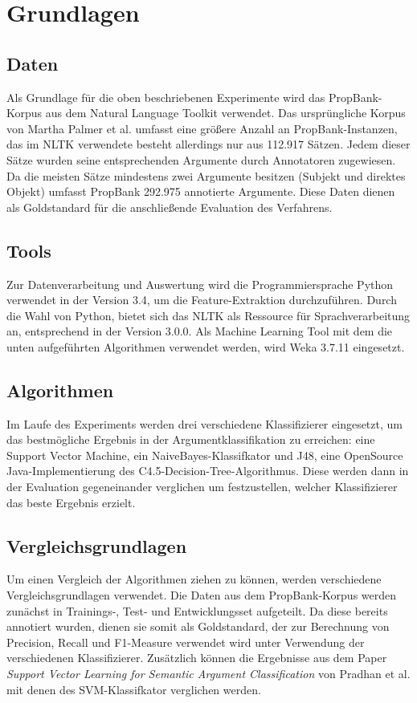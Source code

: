 \documentclass[runningheads]{llncs}
\begin{document}
\section{Grundlagen}

\subsection{Daten}

Als Grundlage f\"ur die oben beschriebenen Experimente wird das PropBank-Korpus aus dem Natural Language Toolkit verwendet. Das urspr\"ungliche Korpus von Martha Palmer et al. \cite{Palmer} umfasst eine gr\"o{\ss}ere Anzahl an PropBank-Instanzen, das im NLTK verwendete besteht allerdings nur aus 112.917 S\"atzen. 
Jedem dieser Sätze wurden seine entsprechenden Argumente durch Annotatoren zugewiesen. Da die meisten S\"atze mindestens zwei Argumente besitzen (Subjekt und direktes Objekt) umfasst PropBank 292.975 annotierte Argumente. Diese Daten dienen als Goldstandard f\"ur die anschlie{\ss}ende Evaluation des Verfahrens.



\subsection{Tools}
Zur Datenverarbeitung und Auswertung wird die Programmiersprache Python verwendet in der Version 3.4, um die Feature-Extraktion durchzuf\"uhren. Durch die Wahl von Python, bietet sich das NLTK als Ressource f\"ur Sprachverarbeitung an, entsprechend in der Version 3.0.0. Als Machine Learning Tool mit dem die unten aufgef\"uhrten
Algorithmen verwendet werden, wird Weka 3.7.11 eingesetzt.

\subsection{Algorithmen}
Im Laufe des Experiments werden drei verschiedene Klassifizierer eingesetzt, um das bestm\"ogliche Ergebnis in der Argumentklassifikation zu erreichen: eine Support Vector
Machine, ein NaiveBayes-Klassifkator und J48, eine OpenSource Java-Implementierung des C4.5-Decision-Tree-Algorithmus. Diese werden dann in der Evaluation gegeneinander 
verglichen um festzustellen, welcher Klassifizierer das beste Ergebnis erzielt. 

\subsection{Vergleichsgrundlagen}
Um einen Vergleich der Algorithmen ziehen zu k\"onnen, werden verschiedene Vergleichsgrundlagen verwendet. Die Daten aus dem PropBank-Korpus werden zun\"achst in Trainings-, Test- und 
Entwicklungsset aufgeteilt. Da diese bereits annotiert wurden, dienen sie somit als Goldstandard, der zur Berechnung von Precision, Recall und F1-Measure verwendet wird unter Verwendung
der verschiedenen Klassifizierer. Zus\"atzlich k\"onnen die Ergebnisse aus dem Paper \textit{Support Vector Learning for Semantic Argument Classiﬁcation} von Pradhan et al. mit denen des SVM-Klassifkator verglichen werden.
\end{document}
